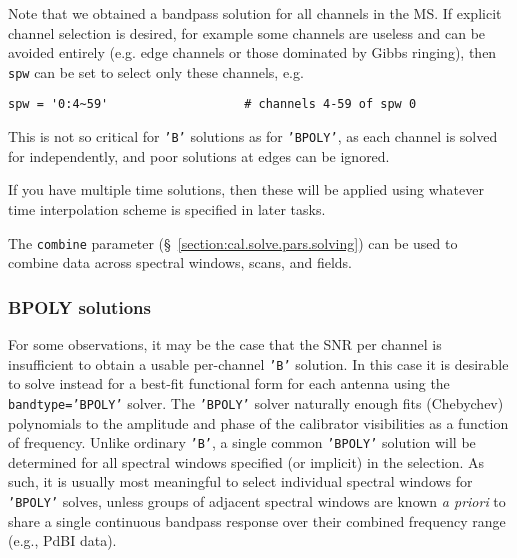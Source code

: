 Note that we obtained a bandpass solution for all channels in the MS.
If explicit channel selection is desired, for example some channels 
are useless and can be avoided entirely (e.g. edge channels or those
dominated by Gibbs ringing), then {\tt spw} can be set to select only
these channels, e.g.
\small
\begin{verbatim}
spw = '0:4~59'                   # channels 4-59 of spw 0
\end{verbatim}
\normalsize
This is not so critical for {\tt 'B'} solutions as for {\tt 'BPOLY'},
as each channel is solved for independently, and poor solutions at
edges can be ignored.

If you have multiple time solutions, then these will be applied using
whatever time interpolation scheme is specified in later tasks. 

The {\tt combine} parameter (\S~\ref{section:cal.solve.pars.solving}) 
can be used to combine data across spectral windows, scans, and fields.

\subsubsection{BPOLY solutions}
\label{section:cal.solve.band.bpoly}

For some observations, it may be the case that the SNR per channel is
insufficient to obtain a usable per-channel {\tt 'B'} solution.  In this
case it is desirable to solve instead for a best-fit functional form
for each antenna using the {\tt bandtype='BPOLY'} solver. 
The {\tt 'BPOLY'} solver naturally enough fits (Chebychev) polynomials to the
amplitude and phase of the calibrator 
visibilities as a function of frequency.  Unlike ordinary {\tt 'B'}, a
single common {\tt 'BPOLY'} solution will be determined for all spectral
windows specified (or implicit) in the selection.  As
such, it is usually most meaningful to select individual spectral
windows for {\tt 'BPOLY'} solves, unless groups of adjacent spectral windows
are known {\it a priori} to share a single continuous bandpass
response over their combined frequency range (e.g., PdBI data).

